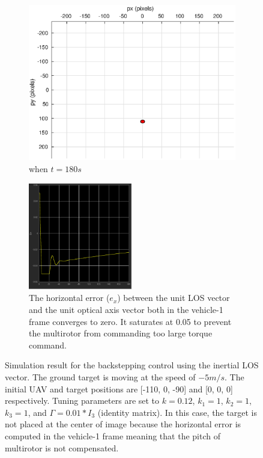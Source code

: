 \begin{figure}
\begin{subfigure}[b]{0.32\linewidth}
		\includegraphics[width=\textwidth]{images/chapter4/inertial_camera_-5mps_180s}
		\caption{when $t=180s$}
	\end{subfigure}	
	\begin{subfigure}[b]{0.8\linewidth}
		\centering
		\includegraphics[width=0.5\textwidth]{images/chapter4/inertial_Ex_-5mps}
		\caption{The horizontal error ($e_x$) between the unit LOS vector and the unit optical axis vector both in the vehicle-1 frame converges to zero. It saturates at 0.05 to prevent the multirotor from commanding too large torque command.}
	\end{subfigure}	
	\caption{Simulation result for the backstepping control using the inertial LOS vector. The ground target is moving at the speed of $-5m/s$. The initial UAV and target positions are [-110, 0, -90] and [0, 0, 0] respectively. Tuning parameters are set to $k=0.12$, $k_1=1$, $k_2=1$, $k_3=1$, and $\Gamma=0.01*I_3$ (identity matrix). In this case, the target is not placed at the center of image because the horizontal error is computed in the vehicle-1 frame meaning that the pitch of multirotor is not compensated.}
	\label{inertial_-5mps}
\end{figure}

